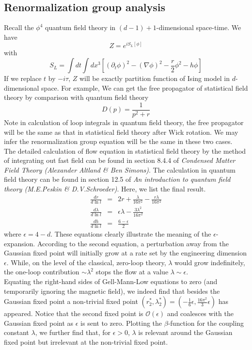 \subsection{Renormalization group analysis}
Recall the  $\phi^4$ quantum field theory in $(d-1) + 1$-dimensional space-time. We have
\[Z = e^{iS_L[\phi]}\]
with
\[S_L = \int dt \int dx^3 \left[(\partial_t \phi)^2 - (\nabla \phi)^2 - \frac{r}{2}\phi^2 -h \phi \right]\]
If we replace $t$ by $-i\tau$, $Z$ will be exactly partition function of Ising model in $d$-dimensional space. For example, We can get the free propagator of statistical field theory by comparison with quantum field theory
\[D(p) = \frac{1}{p^2+r}\]
Note in calculation of loop integrals in quantum field theory, the free propagator will be the same as that in statistical field theory after Wick rotation. We may infer the renormalization group equation will be the same in these two cases. 
\\
The detailed calculation of flow equation in statistical field theory by the method of integrating out fast field can be found in section 8.4.4 of \emph{Condensed Matter Field Theory (Alexander Altland \& Ben Simons)}. The calculation in quantum field theory can be found in section 12.5 of \emph{An introduction to quantum field theory (M.E.Peskin \& D.V.Schroeder)}. Here, we list the final result.
\begin{eqnarray}
\frac{dr}{d\ln l} &=& 2r + \frac{\lambda}{16 \pi^2} - \frac{r\lambda}{16\pi^2} \nonumber \\
\frac{d\lambda}{d\ln l} &=& \epsilon \lambda - \frac{3\lambda^2}{16\pi^2} \nonumber \\
\frac{dh}{d\ln l} &=& \frac{6 - \epsilon}{2} \nonumber
\end{eqnarray}
where $\epsilon = 4-d$.
These equations clearly illustrate the meaning of the $\epsilon$-expansion. According to the second equation, a perturbation away from the Gaussian fixed point will initially grow at a rate set by the engineering dimension $\epsilon$. While, on the level of the classical, zero-loop theory, $\lambda$ would grow indefinitely, the one-loop contribution $\sim \lambda^2$ stops the flow at a value $\lambda \sim \epsilon$.
\\
Equating the right-hand sides of Gell-Mann-Low equations to zero (and temporarily ignoring the magnetic field), we indeed find that besides the Gaussian fixed point a non-trivial fixed point $(r_2^*, \lambda_2^*) = (-\frac{1}{6}\epsilon, \frac{16\pi^2}{3}\epsilon)$ has appeared.
Notice that the second fixed point is $\mathcal{O}(\epsilon)$ and coalesces with the Gaussian fixed point as $\epsilon$ is sent to zero. Plotting the $\beta$-function for the coupling constant $\lambda$, we further find that, for $\epsilon > 0$, $\lambda$ is relevant around the Gaussian fixed point but irrelevant at the non-trivial fixed point.
